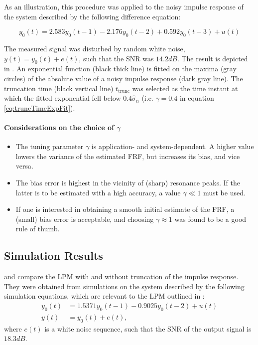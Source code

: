 As an illustration, this procedure was applied to the noisy impulse response of the system described by the following difference equation:

\begin{equation}
y_0(t) = 2.583y_0(t - 1) -2.176y_0(t - 2)+0.592y_0(t-3) + u(t)
\end{equation}

The measured signal was disturbed by random white noise, $y(t) = y_0(t) + e(t)$, such that the \gls{SNR} was $14.2\unit{dB}$.
The result is depicted in . An exponential function (black thick line) is fitted on the maxima (gray circles) of the absolute value of a noisy impulse response (dark gray line). The truncation time (black vertical line) $t_\mathrm{trunc}$ was selected as the time instant at which the fitted exponential fell below $0.4\hat\sigma_n$ (i.e. $\gamma = 0.4$ in equation \eqref{eq:truncTimeExpFit}).

\paragraph*{Considerations on the choice of $\gamma$} 

\begin{itemize}
\item The tuning parameter $\gamma$ is application- and system-dependent.  A higher value lowers the variance of the estimated \gls{FRF}, but increases its bias, and vice versa. 

\item
The bias error is highest in the vicinity of (sharp) resonance peaks. If the latter is to be estimated with a high accuracy, a value $\gamma \ll 1$ must be used. %

\item If one is interested in obtaining a smooth initial estimate of the \gls{FRF}, a (small) bias error is acceptable, and choosing $\gamma \approx 1$ was found to be a good rule of thumb.
\end{itemize}

\subsection{Simulation Results}\label{se:simResults}

 and  compare the \gls{LPM} with and without truncation of the impulse response. 
They were obtained from simulations on  the system described by the following simulation equations, which are relevant to the \gls{LPM} outlined in :
\begin{subequations}
\label{eq:systemSimulations}
\begin{align}
y_0(t)  &= 1.5371y_0(t-1)    -0.9025y_0(t-2) + u(t)
\\
y(t) &= y_0(t) + e(t),
\end{align}
\end{subequations}
where $e(t)$ is a white noise sequence, such that the \gls{SNR} of the output signal is $18.3\unit{dB}$.


